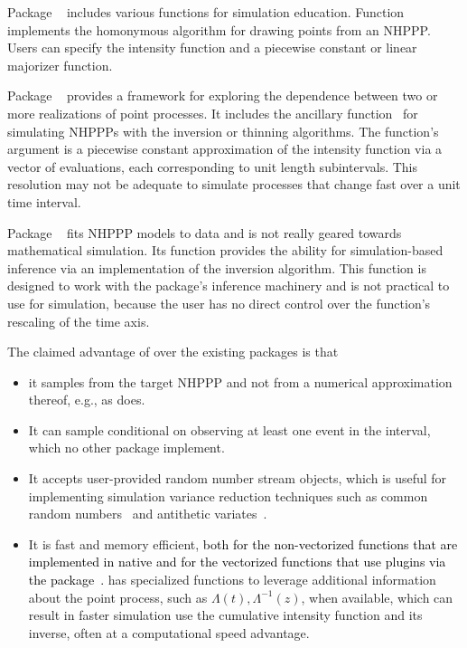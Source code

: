 \documentclass[article,nojss]{jss}\usepackage[]{graphicx}\usepackage[]{xcolor}
\newcommand{\red}[1]{\textcolor{black}{#1}}
\newcommand{\fct}[1]{\code{#1()}}
\begin{document}
Package ~\citep{simEd-package} includes various functions for simulation education. Function \fct{thinning} implements the homonymous algorithm for drawing points from an NHPPP. Users can specify the intensity function and a piecewise constant or linear majorizer function.

Package ~\citep{IndTestPP-package} provides a framework for exploring the dependence between two or more realizations of point processes. It includes the ancillary function~\fct{simNHPc} for simulating NHPPPs with the inversion or thinning algorithms. The function's argument is a piecewise constant approximation of the intensity function via a vector of evaluations, each corresponding to unit length subintervals. This resolution may not be adequate to simulate processes that change fast over a unit time interval.

Package ~\citep{NHPoisson-jss, NHPoisson-package} fits NHPPP models to data and is not really geared towards mathematical simulation. Its \fct{simNHP.fun} function provides the ability for simulation-based inference via an implementation of the inversion algorithm. This function is designed to work with the package's inference machinery and is not practical to use for simulation, because the user has no direct control over the function's rescaling of the time axis.

The claimed advantage of  over the existing packages is that
\begin{itemize}
\item it samples from the target NHPPP and not from a numerical approximation thereof, e.g., as  does.
\item It can  sample conditional on observing at least one event in the interval, which no other package implement.
\item It accepts user-provided random number stream objects, which is useful for implementing simulation variance reduction techniques such as common random numbers~\citep{wright1979crn} and antithetic variates~\citep{hammersley1956av}.
\item It is fast and memory efficient, \red{both for the non-vectorized functions that are implemented in native \proglang{R} and for the vectorized functions that use \proglang{C++} plugins via the \pkg{Rcpp} package~\citep{rcpp-package}.}  has specialized functions to leverage additional information about the point process, such as $\Lambda(t), \Lambda^{-1}(z)$, when available, which can result in faster simulation  use the cumulative intensity function and its inverse, often at a computational speed advantage. 
\end{itemize}
\end{document}
